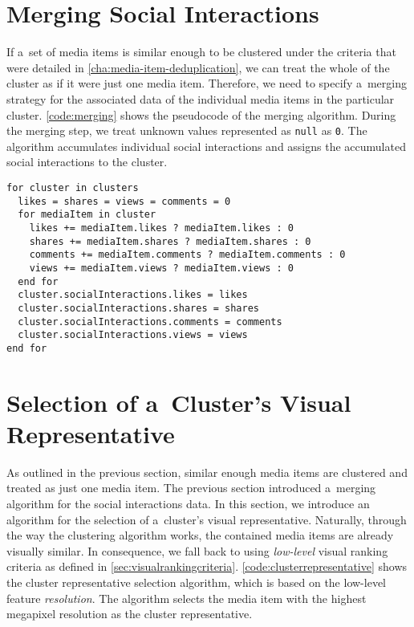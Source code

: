 \section{Merging Social Interactions}

If a~set of media items is similar enough to be clustered
under the criteria that were detailed in
\autoref{cha:media-item-deduplication},
we can treat the whole of the cluster
as if it were just one media item.
Therefore, we need to specify a~merging strategy
for the associated data of the individual media items
in the particular cluster.
\autoref{code:merging} shows the pseudocode of the merging algorithm.
During the merging step,
we treat unknown values represented as \texttt{null} as \texttt{0}.
The algorithm accumulates individual social interactions
and assigns the accumulated social interactions to the cluster.

\begin{lstlisting}[caption=Pseudocode of the social interactions merging algorithm,
  label=code:merging, float]
for cluster in clusters
  likes = shares = views = comments = 0
  for mediaItem in cluster
    likes += mediaItem.likes ? mediaItem.likes : 0
    shares += mediaItem.shares ? mediaItem.shares : 0
    comments += mediaItem.comments ? mediaItem.comments : 0
    views += mediaItem.views ? mediaItem.views : 0
  end for
  cluster.socialInteractions.likes = likes
  cluster.socialInteractions.shares = shares
  cluster.socialInteractions.comments = comments
  cluster.socialInteractions.views = views
end for     
\end{lstlisting}

\section{Selection of a~Cluster's Visual Representative}  

As outlined in the previous section, similar enough media items
are clustered and treated as just one media item.
The previous section introduced
a~merging algorithm for the social interactions data.
In this section, we introduce an algorithm for the selection of
a~cluster's visual representative.
Naturally, through the way the clustering algorithm works,
the contained media items are already visually similar. 
In consequence, we fall back to using \emph{low-level}
visual ranking criteria as defined in \autoref{sec:visualrankingcriteria}.
\autoref{code:clusterrepresentative} shows the cluster representative
selection algorithm, which is based on the low-level feature \emph{resolution}.
The algorithm selects the media item with the highest megapixel resolution
as the cluster representative.


